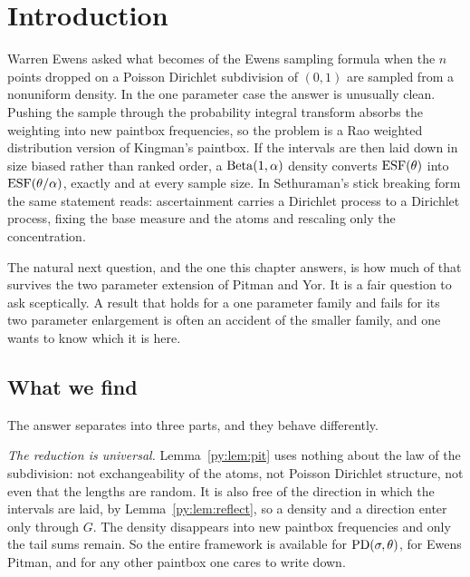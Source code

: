 \section{Introduction}
\label{py:sec:intro}

Warren Ewens asked what becomes of the Ewens sampling formula when the $n$ points dropped on a
Poisson Dirichlet subdivision of $(0,1)$ are sampled from a nonuniform density. In the
one parameter case the answer is unusually clean. Pushing the sample through the probability
integral transform absorbs the weighting into new paintbox frequencies, so the problem is a Rao
weighted distribution version of Kingman's paintbox. If the intervals are then laid down in
size biased rather than ranked order, a $\mathrm{Beta}(1,\alpha)$ density converts $\mathrm{ESF}(\theta)$ into
$\mathrm{ESF}(\theta/\alpha)$, exactly and at every sample size. In Sethuraman's stick breaking form the
same statement reads: ascertainment carries a Dirichlet process to a Dirichlet process, fixing the
base measure and the atoms and rescaling only the concentration.

The natural next question, and the one this chapter answers, is how much of that survives the
two parameter extension of Pitman and Yor. It is a fair question to ask sceptically. A result that
holds for a one parameter family and fails for its two parameter enlargement is often an accident of
the smaller family, and one wants to know which it is here.

\subsection{What we find}

The answer separates into three parts, and they behave differently.

\emph{The reduction is universal.} Lemma~\ref{py:lem:pit} uses nothing about the law of the
subdivision: not exchangeability of the atoms, not Poisson Dirichlet structure, not even that the
lengths are random. It is also free of the direction in which the intervals are laid, by
Lemma~\ref{py:lem:reflect}, so a density and a direction enter only through $G$. The density disappears into new paintbox frequencies and only the tail sums
remain. So the entire framework is available for $\mathrm{PD}(\sigma,\theta)$, for Ewens Pitman, and for
any other paintbox one cares to write down.

